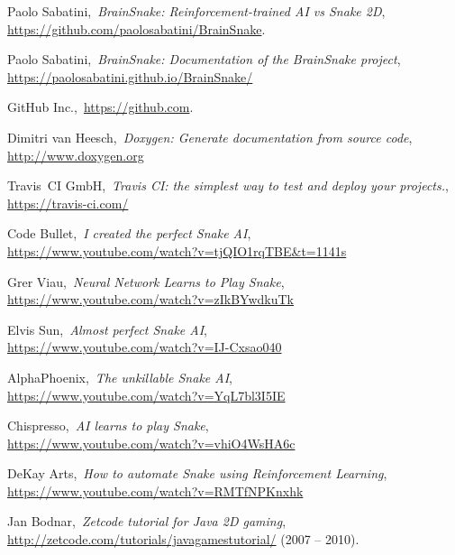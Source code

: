\documentclass{article}
\begin{document}
\begin{thebibliography}{9}

Paolo Sabatini,~\emph{BrainSnake: Reinforcement-trained AI vs Snake 2D},\\\href{https://github.com/paolosabatini/BrainSnake}{https://github.com/paolosabatini/BrainSnake}.

Paolo Sabatini,~\emph{BrainSnake: Documentation of the BrainSnake project},\\ \href{https://paolosabatini.github.io/BrainSnake/}{https://paolosabatini.github.io/BrainSnake/}

GitHub Inc.,~\href{https://github.com}{https://github.com}.

Dimitri van Heesch,~\emph{Doxygen: Generate documentation from source code},\\\href{http://www.doxygen.org}{http://www.doxygen.org}

Travis~CI GmbH,~\emph{Travis CI: the simplest way to test and deploy your projects.},\\\href{https://travis-ci.com/}{https://travis-ci.com/}

Code Bullet,~\emph{I created the perfect Snake AI}, \\ \href{https://www.youtube.com/watch?v=tjQIO1rqTBE&t=1141s}{https://www.youtube.com/watch?v=tjQIO1rqTBE\&t=1141s}

Grer Viau,~\emph{Neural Network Learns to Play Snake},\\ \href{https://www.youtube.com/watch?v=zIkBYwdkuTk}{https://www.youtube.com/watch?v=zIkBYwdkuTk}

Elvis Sun,~\emph{Almost perfect Snake AI},\\ \href{https://www.youtube.com/watch?v=IJ-Cxsao040}{https://www.youtube.com/watch?v=IJ-Cxsao040}

AlphaPhoenix,~\emph{The unkillable Snake AI},\\ \href{https://www.youtube.com/watch?v=YqL7bl3I5IE}{https://www.youtube.com/watch?v=YqL7bl3I5IE}

Chispresso,~\emph{AI learns to play Snake},\\ \href{https://www.youtube.com/watch?v=vhiO4WsHA6c}{https://www.youtube.com/watch?v=vhiO4WsHA6c}

DeKay Arts,~\emph{How to automate Snake using Reinforcement Learning},\\ \href{https://www.youtube.com/watch?v=RMTfNPKnxhk}{https://www.youtube.com/watch?v=RMTfNPKnxhk}

Jan Bodnar,~\emph{Zetcode tutorial for Java 2D gaming},~\\ \href{http://zetcode.com/tutorials/javagamestutorial/}{http://zetcode.com/tutorials/javagamestutorial/} (2007 -- 2010).

\end{thebibliography}


\newpage
\begin{appendices}

\end{appendices}
\end{document}
